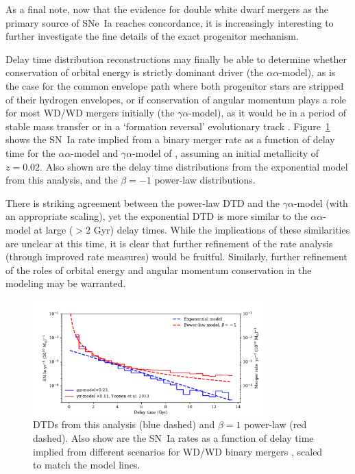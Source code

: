 \documentclass[apj, twocolumn]{aastex62}
\begin{document}
As a final note, now that the evidence for double white dwarf mergers as the primary source of SNe~Ia reaches concordance, it is increasingly interesting to further investigate the fine details of the exact progenitor mechanism. 

Delay time distribution reconstructions may finally be able to determine whether conservation of orbital energy is strictly dominant driver (the $\alpha\alpha$-model), as is the case for the common envelope path where both progenitor stars are stripped of their hydrogen envelopes, or if conservation of angular momentum plays a role for most WD/WD mergers initially (the $\gamma\alpha$-model), as it would be in a period of stable mass transfer or in a `formation reversal' evolutionary track \citep{Toonen:2013le}. Figure~\ref{fig:toonen} shows the SN~Ia rate implied from a binary merger rate as a function of delay time for the $\alpha\alpha$-model and $\gamma\alpha$-model of \cite{Toonen:2013ng}, assuming an initial metallicity of $z=0.02$. Also shown are the delay time distributions from the exponential model from this analysis, and the $\beta=-1$ power-law distributions. 

There is striking agreement between the power-law DTD and the $\gamma\alpha$-model (with an appropriate scaling), yet the exponential DTD is more similar to the $\alpha\alpha$-model at large ($>2$ Gyr) delay times. While the implications of these similarities are unclear at this time, it is clear that further refinement of the rate analysis (through improved rate measures) would be fruitful. Similarly, further refinement of the roles of orbital energy and angular momentum conservation in the modeling may be warranted. 

\begin{figure}[t] 
   \centering
   \includegraphics[width=3.5in]{figure_toonen.pdf}
   \caption{\footnotesize DTDs from this analysis (blue dashed) and $\beta=1$ power-law (red dashed). Also show are the SN~Ia rates as a function of delay time implied from different scenarios for WD/WD binary mergers \citep[see][]{Toonen:2013ng}, scaled to match the model lines. }
   \label{fig:toonen}
\end{figure}
\end{document}
